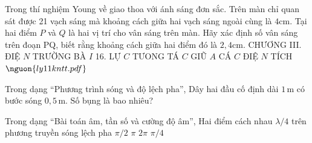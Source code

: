 \begin{ex}
Trong thí nghiệm Young về giao thoa với ánh sáng đơn sắc. Trên màn chỉ quan sát được 21 vạch sáng mà khoảng cách giữa hai vạch sáng ngoài cùng là $4 \mathrm{cm}$. Tại hai điểm $P$ và $Q$ là hai vị trí cho vân sáng trên màn. Hãy xác định số vân sáng trên đoạn PQ, biết rằng khoảng cách giữa hai điểm đó là $2,4 \mathrm{cm}$. CHƯƠNG III. ĐIỆ $N$ TRƯỜNG BÀ $I$ 16. LỰ $C$ TƯONG TÁ $C$ GIŨ $A$ CÁ $C$ ĐIỆ $N$ TÍCH $\nguon{ly11 kntt.pdf}$
\choiceTF

\end{ex}

\begin{ex}
Trong dạng “Phương trình sóng và độ lệch pha”, Dây hai đầu cố định dài $1\,\text{m}$ có bước sóng $0,5\,\text{m}$. Số bụng là bao nhiêu?
\end{ex}

\begin{ex}
Trong dạng “Bài toán âm, tần số và cường độ âm”, Hai điểm cách nhau $\lambda/4$ trên phương truyền sóng lệch pha
\choice
{\True $\pi/2$}
{$\pi$}
{$2\pi$}
{$\pi/4$}
\end{ex}

